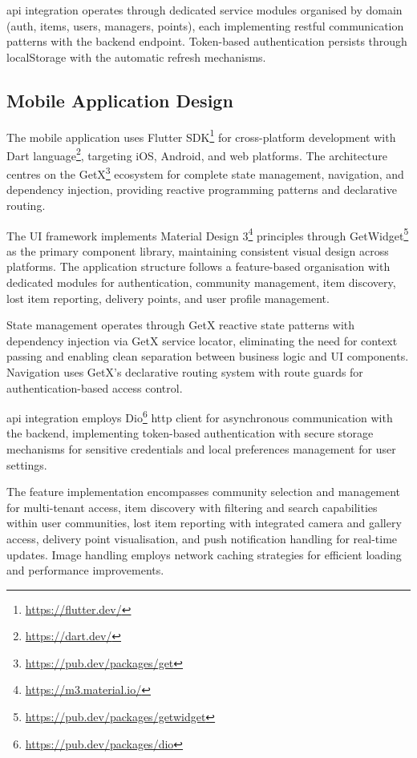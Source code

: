\ac{api} integration operates through dedicated service modules organised by domain (auth, items, users, managers, points), each implementing \ac{rest}ful communication patterns with the backend endpoint. Token-based authentication persists through localStorage with the automatic refresh mechanisms.

\subsection{Mobile Application Design} \label{subsection:mobile_application}

The mobile application uses Flutter SDK\footnote{\url{https://flutter.dev/}} for cross-platform development with Dart language\footnote{\url{https://dart.dev/}}, targeting iOS, Android, and web platforms. The architecture centres on the GetX\footnote{\url{https://pub.dev/packages/get}} ecosystem for complete state management, navigation, and dependency injection, providing reactive programming patterns and declarative routing.

The UI framework implements Material Design 3\footnote{\url{https://m3.material.io/}} principles through GetWidget\footnote{\url{https://pub.dev/packages/getwidget}} as the primary component library, maintaining consistent visual design across platforms. The application structure follows a feature-based organisation with dedicated modules for authentication, community management, item discovery, lost item reporting, delivery points, and user profile management.

State management operates through GetX reactive state patterns with dependency injection via GetX service locator, eliminating the need for context passing and enabling clean separation between business logic and UI components. Navigation uses GetX's declarative routing system with route guards for authentication-based access control.

\ac{api} integration employs Dio\footnote{\url{https://pub.dev/packages/dio}} \ac{http} client for asynchronous communication with the backend, implementing token-based authentication with secure storage mechanisms for sensitive credentials and local preferences management for user settings.

The feature implementation encompasses community selection and management for multi-tenant access, item discovery with filtering and search capabilities within user communities, lost item reporting with integrated camera and gallery access, delivery point visualisation, and push notification handling for real-time updates. Image handling employs network caching strategies for efficient loading and performance improvements.

